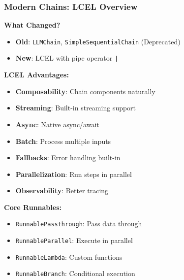 \begin{frame}\frametitle{Modern Chains: LCEL Overview}

\textbf{What Changed?}
\begin{itemize}
\item \textbf{Old}: \texttt{LLMChain}, \texttt{SimpleSequentialChain} (Deprecated)
\item \textbf{New}: LCEL with pipe operator \texttt{|}
\end{itemize}

\textbf{LCEL Advantages:}
\begin{itemize}
\item \textbf{Composability}: Chain components naturally
\item \textbf{Streaming}: Built-in streaming support
\item \textbf{Async}: Native async/await
\item \textbf{Batch}: Process multiple inputs
\item \textbf{Fallbacks}: Error handling built-in
\item \textbf{Parallelization}: Run steps in parallel
\item \textbf{Observability}: Better tracing
\end{itemize}

\textbf{Core Runnables:}
\begin{itemize}
\item \texttt{RunnablePassthrough}: Pass data through
\item \texttt{RunnableParallel}: Execute in parallel
\item \texttt{RunnableLambda}: Custom functions
\item \texttt{RunnableBranch}: Conditional execution
\end{itemize}

\end{frame}

